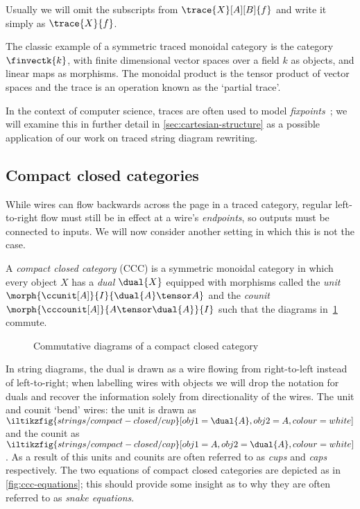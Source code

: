 Usually we will omit the subscripts from \(\trace{X}[A][B]{f}\) and write it
simply as \(\trace{X}{f}\).



\begin{example}
    The classic example of a symmetric traced monoidal category is the category
    \(\finvectk{k}\), with finite dimensional vector spaces over a field \(k\)
    as objects, and linear maps as morphisms.
    The monoidal product is the tensor product of vector spaces and the
    trace is an operation known as the `partial trace'.
\end{example}

In the context of computer science, traces are often used to model
\emph{fixpoints}~\cite{hasegawa1997recursion}; we will examine this in further
detail in \cref{sec:cartesian-structure} as a possible application of our work
on traced string diagram rewriting.

\subsection{Compact closed categories}

While wires can flow backwards across the page in a traced category, regular
left-to-right flow must still be in effect at a wire's \emph{endpoints}, so
outputs must be connected to inputs.
We will now consider another setting in which this is not the case.

\begin{definition}
    A \emph{compact closed category} (CCC) is a symmetric monoidal category in
    which every object \(X\) has a \emph{dual} \(\dual{X}\) equipped with
    morphisms called the \emph{unit} \(
    \morph{\ccunit[A]}{I}{\dual{A} \tensor A}
    \) and the \emph{counit} \(
    \morph{\cccounit[A]}{A \tensor \dual{A}}{I}
    \) such that the diagrams in~\cref{fig:snake-equations} commute.
\end{definition}

\begin{figure}
    \centering
    
    \quad
    
    \caption{Commutative diagrams of a compact closed category}
    \label{fig:snake-equations}
\end{figure}

In string diagrams, the dual is drawn as a wire flowing from right-to-left
instead of left-to-right; when labelling wires with objects we will drop the
notation for duals and recover the information solely from directionality of the
wires.
The unit and counit `bend' wires: the unit is drawn as \(
\iltikzfig{strings/compact-closed/cup}[obj1=\dual{A},obj2=A,colour=white]
\) and the counit as \(
\iltikzfig{strings/compact-closed/cap}[obj1=A,obj2=\dual{A},colour=white]
\).
As a result of this units and counits are often referred to as \emph{cups} and
\emph{caps} respectively.
The two equations of compact closed categories are depicted as in
\cref{fig:ccc-equations}; this should provide some insight as to why they are
often referred to as \emph{snake equations}.

